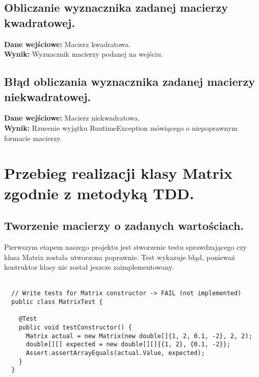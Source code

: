\documentclass[a4paper,12pt,twoside]{article}
\begin{document}
\subsection{Obliczanie wyznacznika zadanej macierzy kwadratowej.}

\textbf{Dane wejściowe:} Macierz kwadratowa.\\
\textbf{Wynik:} Wyznacznik macierzy podanej na wejściu.

\subsection{Błąd obliczania wyznacznika zadanej macierzy niekwadratowej.}

\textbf{Dane wejściowe:} Macierz niekwadratowa.\\
\textbf{Wynik:} Rzucenie wyjątku RuntimeException mówiącego o niepoprawnym formacie macierzy.


\section{Przebieg realizacji klasy Matrix zgodnie z metodyką TDD.}
\bigskip


\subsection{Tworzenie macierzy o zadanych wartościach.}
\bigskip

Pierwszym etapem naszego projektu jest stworzenie testu sprawdzającego czy klasa Matrix
została utworzona poprawnie. Test wykazuje błąd, ponieważ kontruktor klasy nie został
jeszcze zaimplementowany.\\\\

\begin{lstlisting}
  // Write tests for Matrix constructor -> FAIL (not implemented)
  public class MatrixTest {

    @Test
    public void testConstructor() {
      Matrix actual = new Matrix(new double[]{1, 2, 0.1, -2}, 2, 2);
      double[][] expected = new double[][]{{1, 2}, {0.1, -2}};
      Assert.assertArrayEquals(actual.Value, expected);
    }
  }
\end{lstlisting}
\end{document}
